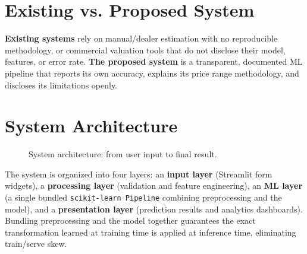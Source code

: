 \documentclass[12pt,a4paper]{report}
\begin{document}
\section*{Existing vs. Proposed System}
\textbf{Existing systems} rely on manual/dealer estimation with no
reproducible methodology, or commercial valuation tools that do not
disclose their model, features, or error rate. \textbf{The proposed
system} is a transparent, documented ML pipeline that reports its own
accuracy, explains its price range methodology, and discloses its
limitations openly.

\section*{System Architecture}
\begin{figure}[H]
\centering
{}
\caption{System architecture: from user input to final result.}
\end{figure}

The system is organized into four layers: an \textbf{input layer}
(Streamlit form widgets), a \textbf{processing layer} (validation and
feature engineering), an \textbf{ML layer} (a single bundled
\texttt{scikit-learn Pipeline} combining preprocessing and the model), and
a \textbf{presentation layer} (prediction results and analytics
dashboards). Bundling preprocessing and the model together guarantees the
exact transformation learned at training time is applied at inference
time, eliminating train/serve skew.
\end{document}
